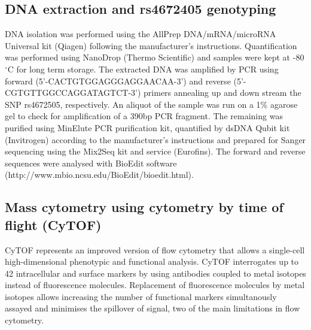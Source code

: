 \subsection{DNA extraction and rs4672405 genotyping}
DNA isolation was performed using the AllPrep DNA/mRNA/microRNA Universal kit (Qiagen) following the manufacturer's instructions. Quantification was performed using NanoDrop (Thermo Scientific) and samples were kept at -80{$^\circ$}C for long term storage. The extracted DNA was amplified by PCR using forward (5'-CACTGTGGAGGGAGGAACAA-3') and reverse (5'-CGTGTTGGCCAGGATAGTCT-3') primers annealing up and down stream the SNP rs4672505, respectively. An aliquot of the sample was run on a 1\% agarose gel to check for amplification of a 390bp PCR fragment. The remaining was purified using MinElute PCR purification kit, quantified by dsDNA Qubit kit (Invitrogen) according to the manufacturer's instructions and prepared for Sanger sequencing using the Mix2Seq kit and service (Eurofins). The forward and reverse sequences were analysed with BioEdit software (http://www.mbio.ncsu.edu/BioEdit/bioedit.html).



\subsection{Mass cytometry using cytometry by time of flight (CyTOF)}
\textcolor[rgb]{1,0,0}{CyTOF represents an improved version of flow cytometry that allows a single-cell high-dimensional phenotypic and functional analysis. CyTOF interrogates up to 42 intracellular and surface markers by using antibodies coupled to metal isotopes instead of fluorescence molecules. Replacement of fluorescence molecules by metal isotopes allows increasing the number of functional markers simultanously assayed and minimises the spillover of signal, two of the main limitations in flow cytometry.}

